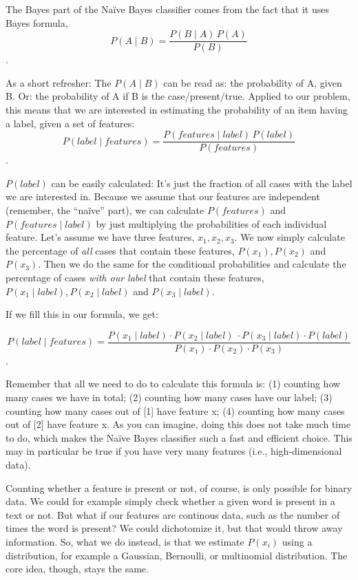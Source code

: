 The Bayes part of the Na\"ive Bayes classifier comes from the fact that it uses Bayes formula, $$ P(A \mid B) = \frac{P(B \mid A) \, P(A)}{P(B)} $$.

As a short refresher: The $P(A \mid B)$ can be read as: the probability of A, given B. Or: the probability of A if B is the case/present/true.
Applied to our problem, this means that we are interested in estimating the probability of an item having a label, given a set of features:
$$ P(label \mid features) = \frac{P(features \mid label) \, P(label)}{P(features)} $$.

$P(label)$ can be easily calculated: It's just the fraction of all cases with the label we are interested in.
Because we assume that our features are independent (remember, the ``na\"ive'' part), we can calculate $P(features)$ and $P(features\mid label)$ by just multiplying the probabilities of each individual feature.
Let's assume we have three features, $x_1, x_2, x_3$.
We now simply calculate the percentage  of \emph{all} cases that contain these features, $P(x_1), P(x_2)$ and $P(x_3)$.
Then we do the same for the conditional probabilities and calculate  the percentage  of  cases \emph{with our label} that contain these features, $P(x_1\mid label), P(x_2\mid label)$ and $P(x_3\mid label)$.

If we fill this in our formula, we get:


$$ P(label \mid features) = \frac{P(x_1 \mid label) \cdot P(x_2 \mid label)\ \cdot P(x_3 \mid label) \cdot P(label)}{P(x_1) \cdot P(x_2) \cdot P(x_3)}$$.

Remember that all we need to do to calculate this formula is: (1) counting how many cases we have in total; (2) counting how many cases have our label; (3) counting how many cases out of [1] have feature x; (4) counting how many cases out of [2] have feature x.
As you can imagine, doing this does not take much time to do, which makes the Na\"ive Bayes classifier such a fast and efficient choice.
This may in particular be true if you have very many features (i.e., high-dimensional
data).

Counting whether a feature is present or not, of course, is only possible for binary data. We could for example simply check whether a given word is present in a text or not.
But what if our features are continous data, such as the number of times the word is present?
We could dichotomize it, but that would throw away information.
So, what we do instead, is that we estimate $P(x_i)$ using a distribution, for example
a Gaussian, Bernoulli, or multinomial distribution. The core idea, though, stays the same.



